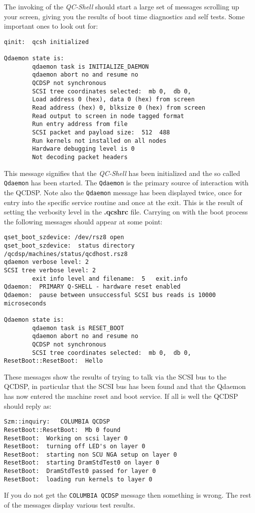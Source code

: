 The invoking of the {\em QC-Shell} should start a large set of messages
scrolling up your screen, giving you the results of boot time diagnostics
and self tests. Some important ones to look out for:
\begin{verbatim}
qinit:  qcsh initialized

Qdaemon state is:
        qdaemon task is INITIALIZE_DAEMON
        qdaemon abort no and resume no
        QCDSP not synchronous
        SCSI tree coordinates selected:  mb 0,  db 0,  
        Load address 0 (hex), data 0 (hex) from screen
        Read address (hex) 0, blksize 0 (hex) from screen
        Read output to screen in node tagged format
        Run entry address from file
        SCSI packet and payload size:  512  488
        Run kernels not installed on all nodes
        Hardware debugging level is 0
        Not decoding packet headers
\end{verbatim}
This message signifies that the {\em QC-Shell} has been initialized
and the so called {\tt Qdaemon} has been started. The {\tt Qdaemon}
is the primary source of interaction with the QCDSP. Note also 
the {\tt Qdaemon} message has been displayed twice, once for entry 
into the specific service routine and once at the exit. This is the 
result of setting the verbosity level in the {\bf .qcshrc} file.
Carrying on with the boot process the following messages should appear
at some point:
\begin{verbatim}
qset_boot_szdevice: /dev/rsz8 open
qset_boot_szdevice:  status directory /qcdsp/machines/status/qcdhost.rsz8
qdaemon verbose level: 2
SCSI tree verbose level: 2
        exit info level and filename:  5   exit.info
Qdaemon:  PRIMARY Q-SHELL - hardware reset enabled
Qdaemon:  pause between unsuccessful SCSI bus reads is 10000 microseconds

Qdaemon state is:
        qdaemon task is RESET_BOOT
        qdaemon abort no and resume no
        QCDSP not synchronous
        SCSI tree coordinates selected:  mb 0,  db 0,  
ResetBoot::ResetBoot:  Hello
\end{verbatim}
These messages show the results of trying to talk via
the SCSI bus to the QCDSP, in particular that the SCSI bus has been 
found and that the Qdaemon has now entered the machine reset and boot
service. If all is well the QCDSP should reply as:
\begin{verbatim}
Szm::inquiry:   COLUMBIA QCDSP
ResetBoot::ResetBoot:  Mb 0 found
ResetBoot:  Working on scsi layer 0
ResetBoot:  turning off LED's on layer 0
ResetBoot:  starting non SCU NGA setup on layer 0
ResetBoot:  starting DramStdTest0 on layer 0
ResetBoot:  DramStdTest0 passed for layer 0
ResetBoot:  loading run kernels to layer 0
\end{verbatim}
If you do not get the {\tt COLUMBIA QCDSP} message then
something is wrong. The rest of the messages display various test 
results.

